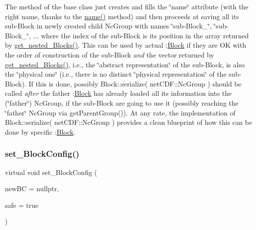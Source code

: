 The method of the base class just creates and fills the \char`\"{}name\char`\"{} attribute (with the right name, thanks to the \mbox{\hyperlink{class_s_m_spp__di__unipi__it_1_1_block_a738e9dfd6e00507da219e4bd5a3f6be9}{name()}} method) and then proceeds at saving all its sub-\/\+Block in newly created child Nc\+Group with names \char`\"{}sub-\/\+Block\+\_\char`\"{}, \char`\"{}sub-\/\+Block\+\_\char`\"{}, ... where the index of the sub-\/\+Block is its position in the array returned by \mbox{\hyperlink{class_s_m_spp__di__unipi__it_1_1_block_a39bc932e28075740f08b392830a67e03}{get\+\_\+nested\+\_\+\+Blocks()}}. This can be used by actual \+:\mbox{\hyperlink{class_s_m_spp__di__unipi__it_1_1_block}{Block}} if they are OK with the order of construction of the sub-\/\+Block {\itshape and} the vector returned by \mbox{\hyperlink{class_s_m_spp__di__unipi__it_1_1_block_a39bc932e28075740f08b392830a67e03}{get\+\_\+nested\+\_\+\+Blocks()}}, i.\+e., the \char`\"{}abstract representation\char`\"{} of the sub-\/\+Block, is also the \char`\"{}physical one\char`\"{} (i.\+e., there is no distinct \char`\"{}physical representation\char`\"{} of the sub-\/\+Block). If this is done, possibly Block\+::serialize( net\+C\+D\+F\+::\+Nc\+Group ) should be called {\itshape after} the father \+:\mbox{\hyperlink{class_s_m_spp__di__unipi__it_1_1_block}{Block}} has already loaded all its information into the (\char`\"{}father\char`\"{}) Nc\+Group, if the sub-\/\+Block are going to use it (possibly reaching the \char`\"{}father\char`\"{} Nc\+Group via get\+Parent\+Group()). At any rate, the implementation of Block\+::serialize( net\+C\+D\+F\+::\+Nc\+Group ) provides a clean blueprint of how this can be done by specific \+:\mbox{\hyperlink{class_s_m_spp__di__unipi__it_1_1_block}{Block}}. \mbox{\label{class_s_m_spp__di__unipi__it_1_1_block_a18d411b740a47db00d15083c5c7ef2ba}} 
\subsubsection{\texorpdfstring{set\+\_\+\+Block\+Config()}{set\_BlockConfig()}}
{\footnotesize\ttfamily virtual void set\+\_\+\+Block\+Config (\begin{DoxyParamCaption}\item[{\mbox{\hyperlink{class_s_m_spp__di__unipi__it_1_1_block_config}{Block\+Config}} $\ast$}]{new\+BC = {\ttfamily nullptr},  }\item[{const bool}]{safe = {\ttfamily true} }\end{DoxyParamCaption})\hspace{0.3cm}{\ttfamily [virtual]}}



